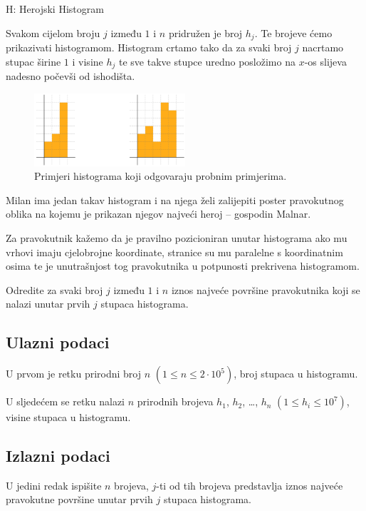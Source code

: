 \begin{statement}[
  timelimit=1 s,
  memorylimit=512 MiB,
]{H: Herojski Histogram}

Svakom cijelom broju $j$ između $1$ i $n$ pridružen je broj $h_j$. Te brojeve
ćemo prikazivati histogramom. Histogram crtamo tako da za svaki broj $j$
nacrtamo stupac širine $1$ i visine $h_j$ te sve takve stupce uredno posložimo
na $x$-os slijeva nadesno počevši od ishodišta.

\setlength{\belowcaptionskip}{-10pt}
\begin{figure}[H]
\centering
\includegraphics[width=0.5\textwidth]{pic/histogram.png}
\caption{Primjeri histograma koji odgovaraju probnim primjerima.}
\end{figure}

Milan ima jedan takav histogram i na njega želi zalijepiti poster pravokutnog
oblika na kojemu je prikazan njegov najveći heroj -- gospodin Malnar.

Za pravokutnik kažemo da je pravilno pozicioniran unutar histograma ako mu
vrhovi imaju cjelobrojne koordinate, stranice su mu paralelne s koordinatnim
osima te je unutrašnjost tog pravokutnika u potpunosti prekrivena histogramom.

Odredite za svaki broj $j$ između $1$ i $n$ iznos najveće površine pravokutnika
koji se nalazi unutar prvih $j$ stupaca histograma.

\subsection*{Ulazni podaci}
U prvom je retku prirodni broj $n$ $(1 \le n \le 2 \cdot 10^5)$,  broj stupaca u
histogramu.

U sljedećem se retku nalazi $n$ prirodnih brojeva $h_1$, $h_2$, \dots, $h_n$
$(1 \le h_i \le 10^7)$, visine stupaca u histogramu.


\subsection*{Izlazni podaci}
U jedini redak ispišite $n$ brojeva, $j$-ti od tih brojeva predstavlja iznos
najveće pravokutne površine unutar prvih $j$ stupaca histograma.


\end{statement}

